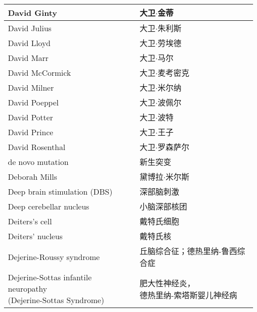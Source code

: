 \begin{longtable}{lll}
	\midrule
	David Ginty     &&  大卫$\cdot$金蒂  \\
	
	\midrule
	David Julius     &&  大卫$\cdot$朱利斯  \\
	
	\midrule
	David Lloyd     &&  大卫$\cdot$劳埃德  \\
	
	\midrule
	David Marr     &&  大卫$\cdot$马尔  \\
	
	\midrule
	David McCormick     &&  大卫$\cdot$麦考密克  \\
	
	\midrule
	David Milner     &&  大卫$\cdot$米尔纳  \\
	
	\midrule
	David Poeppel     &&  大卫$\cdot$波佩尔  \\
	
	\midrule
	David Potter     &&  大卫$\cdot$波特  \\
	
	\midrule
	David Prince     &&  大卫$\cdot$王子  \\
	
	\midrule
	David Rosenthal     &&  大卫$\cdot$罗森萨尔  \\
	
	\midrule
	de novo mutation     &&  新生突变  \\
	
	\midrule
	Deborah Mills     &&  黛博拉$\cdot$米尔斯  \\
	
	\midrule
	Deep brain stimulation (DBS)     &&  深部脑刺激  \\
	
	\midrule
	Deep cerebellar nucleus   &&  小脑深部核团  \\
	
	\midrule
	Deiters's cell   &&  戴特氏细胞  \\
	
	\midrule
	Deiters' nucleus   &&  戴特氏核  \\
	
	\midrule
	Dejerine-Roussy syndrome   &&  丘脑综合征；德热里纳-鲁西综合症  \\
	
	\midrule
	\makecell[l]{Dejerine-Sottas infantile neuropathy \\ (Dejerine-Sottas Syndrome)}  &&  \makecell{肥大性神经炎，\\德热里纳-索塔斯婴儿神经病}  \\
	

\end{longtable}

